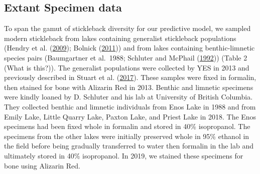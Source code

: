 \documentclass[
  12pt,
]{article}
\begin{document}
\hypertarget{extant-specimen-data}{%
\subsection{Extant Specimen data}\label{extant-specimen-data}}

To span the gamut of stickleback diversity for our predictive model, we
sampled modern stickleback from lakes containing generalist stickleback
populations (Hendry et al. (\protect\hyperlink{ref-Hendry2009}{2009});
Bolnick (\protect\hyperlink{ref-Bolnick2011}{2011})) and from lakes
containing benthic-limnetic species pairs (Baumgartner et al.~1988;
Schluter and McPhail (\protect\hyperlink{ref-Schluter1992}{1992}))
(Table 2 (What is this?)). The generalist populations were collected by
YES in 2013 and previously described in Stuart et al.
(\protect\hyperlink{ref-Stuart2017}{2017}). These samples were fixed in
formalin, then stained for bone with Alizarin Red in 2013. Benthic and
limnetic specimens were kindly loaned by D. Schluter and his lab at
University of British Columbia. They collected benthic and limnetic
individuals from Enos Lake in 1988 and from Emily Lake, Little Quarry
Lake, Paxton Lake, and Priest Lake in 2018. The Enos specimens had been
fixed whole in formalin and stored in 40\% isopropanol. The specimens
from the other lakes were initially preserved whole in 95\% ethanol in
the field before being gradually transferred to water then formalin in
the lab and ultimately stored in 40\% isopropanol. In 2019, we stained
these specimens for bone using Alizarin Red.
\end{document}
